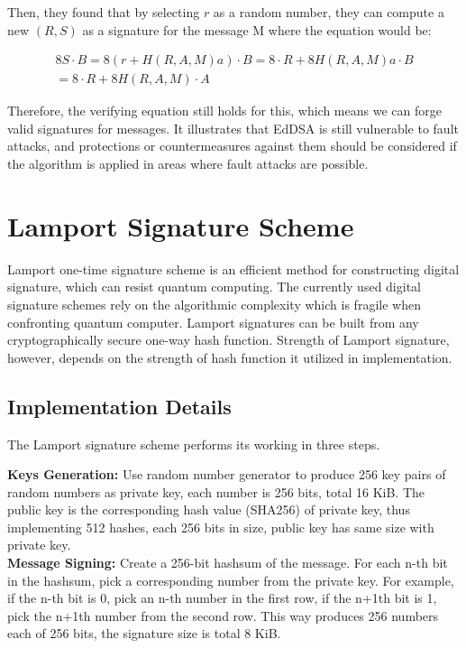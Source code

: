 \documentclass[10pt,sigconf]{acmart}
\begin{document}
Then, they found that by selecting $r$ as a random number, they can compute a new $(R, S)$ as a signature for the message M where the equation would be:

\begin{align*}
    8S \cdot B = 8(r + H(R,A,M) a) \cdot B = 8 \cdot R + 8H(R,A,M) a \cdot B \\
    = 8 \cdot R + 8H(R,A,M) \cdot A
\end{align*}


Therefore, the verifying equation still holds for this, which means we can forge valid signatures for messages. It illustrates that EdDSA is still vulnerable to fault attacks, and protections or countermeasures against them should be considered if the algorithm is applied in areas where fault attacks are possible.




\section{Lamport Signature Scheme}

Lamport one-time signature scheme is an efficient method for constructing digital signature, which can resist quantum computing. The currently used digital signature schemes rely on the algorithmic complexity which is fragile when confronting quantum computer. Lamport signatures can be built from any cryptographically secure one-way hash function. Strength of Lamport signature, however, depends on the strength of hash function it utilized in implementation.

\subsection{Implementation Details}

The Lamport signature scheme performs its working in three steps. 

\vspace{0.5em}

\noindent\textbf{Keys Generation:} \quad Use random number generator to produce 256 key pairs of random numbers as private key, each number is 256 bits, total 16 KiB. The public key is the corresponding hash value (SHA256) of private key, thus implementing 512 hashes, each 256 bits in size, public key has same size with private key.\\

\noindent\textbf{Message Signing:} \quad Create a 256-bit hashsum of the message. For each n-th bit in the hashsum, pick a corresponding number from the private key. For example, if the n-th bit is 0, pick an n-th number in the first row, if the n+1th bit is 1, pick the n+1th number from the second row. This way produces 256 numbers each of 256 bits, the signature size is total 8 KiB.\\
\end{document}
